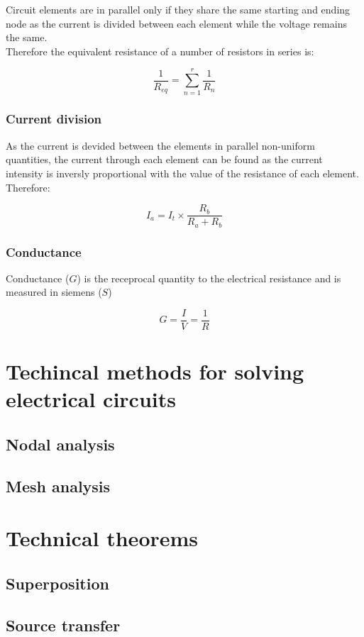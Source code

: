 \documentclass[a4paper]{book}
\begin{document}
Circuit elements are in parallel only if they share the same starting and ending node as the current is 
divided between each element while the voltage remains the same.\\
Therefore the equivalent resistance of a number of resistors in series is:

\[\frac{1}{R_{eq}} = \sum_{n=1}^r \frac{1}{R_n}\]

\subsubsection{Current division}

As the current is devided between the elements in parallel non-uniform quantities, the current through
each element can be found as the current intensity is inversly proportional with the value of the resistance of each element. Therefore:

\[I_a = I_{t} \times \frac{R_b}{R_a + R_b}\]

\subsubsection{Conductance}

Conductance ($G$) is the receprocal quantity to the electrical resistance and is measured in siemens ($S$)

\[G = \frac{I}{V} = \frac{1}{R}\]

\section{Techincal methods for solving electrical circuits}

  \subsection{Nodal analysis}

  \subsection{Mesh analysis}

\section{Technical theorems}
  \subsection{Superposition}
  \subsection{Source transfer}
\end{document}
